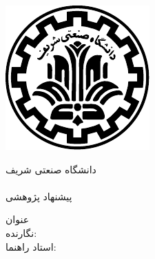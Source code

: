 \begin{center}
\thispagestyle{empty}
\includegraphics{Figs/logo} \\
\begin{Large}
دانشگاه صنعتی شریف \\
\fadepart \\ [1cm]
پیشنهاد پژوهشی \falevel \\

\end{Large}
\vskip 3cm
\large{عنوان}  \\ \textbf{\large{\fatitle}}
\vskip 2cm
\large{نگارنده:} \\ \Large{\faAuthor}
\vskip 2cm
\large{استاد راهنما:} \\ \Large{\fasupervisor}
\vskip 2cm
\large{\fadate}
\end{center}

